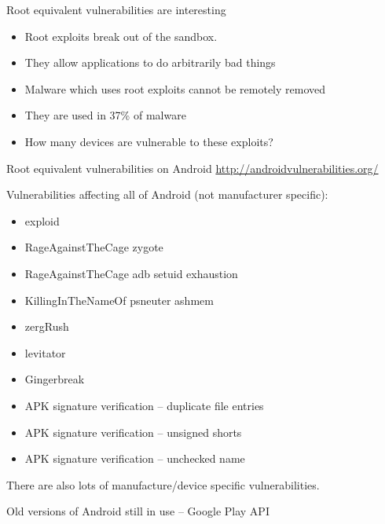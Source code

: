 \documentclass{beamer}
\begin{document}
\begin{frame}{Root equivalent vulnerabilities are interesting}{}
 \begin{itemize}
  \item Root exploits break out of the sandbox.
  \note{}
  \item They allow applications to do arbitrarily bad things
  \item Malware which uses root exploits cannot be remotely removed
  \item They are used in 37\% of malware %
  \item How many devices are vulnerable to these exploits?
 \end{itemize}
\end{frame}

\begin{frame}{Root equivalent vulnerabilities on Android}{}
\small \url{http://androidvulnerabilities.org/}

Vulnerabilities affecting all of Android (not manufacturer specific):
 \begin{itemize}
  \item exploid
  \item RageAgainstTheCage zygote
  \item RageAgainstTheCage adb setuid exhaustion
  \item KillingInTheNameOf psneuter ashmem
  \item zergRush
  \item levitator
  \item Gingerbreak
  \item APK signature verification -- duplicate file entries
  \item APK signature verification -- unsigned shorts
  \item APK signature verification -- unchecked name
 \end{itemize}
There are also lots of manufacture/device specific vulnerabilities.
\end{frame}

\begin{frame}[plain]{Old versions of Android still in use -- Google Play API}{}
 \begin{center}
 \end{center}
\end{frame}
\end{document}
